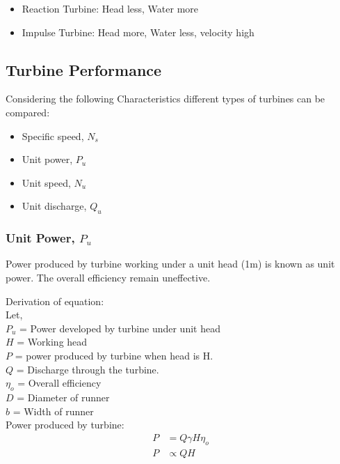\documentclass{article}
\begin{document}
      \begin{multicols}{2}
        \begin{itemize}
          \item Reaction Turbine: Head less, Water more 
          \item Impulse Turbine: Head more, Water less, velocity high 
        \end{itemize}

        \subsection*{Turbine Performance}
        Considering the following Characteristics different types of turbines can be compared:
        \begin{itemize}
          \item Specific speed, $N_s$
          \item Unit power, $P_u$
          \item Unit speed, $N_u$
          \item Unit discharge, $Q_u$
        \end{itemize}


        \subsubsection{Unit Power, $P_u$}
        Power produced by turbine working under a unit head (1m) is known as unit power. The overall efficiency remain uneffective.

        Derivation of equation:\\
        Let,\\
        $P_u$ = Power developed by turbine under unit head\\
        $H$ = Working head \\
        $P$ = power produced by turbine when head is H. \\ 
        $Q$ = Discharge through the turbine. \\
        $\eta_o$ = Overall efficiency \\
        $D$ = Diameter of runner \\
        $b$ = Width of runner\\

        Power produced by turbine:\\
        \begin{align*}
          P &= Q \gamma H \eta_o \\
          P & \propto Q H
        \end{align*}
        

\end{multicols}
\end{document}
